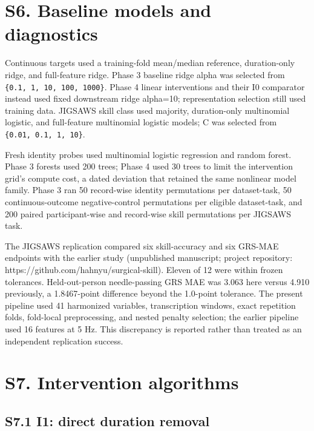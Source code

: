 \documentclass[11pt]{article}
\begin{document}
\section{S6. Baseline models and
diagnostics}\label{s6.-baseline-models-and-diagnostics}

Continuous targets used a training-fold mean/median reference,
duration-only ridge, and full-feature ridge. Phase 3 baseline ridge
alpha was selected from \texttt{\{0.1,\ 1,\ 10,\ 100,\ 1000\}}. Phase 4
linear interventions and their I0 comparator instead used fixed
downstream ridge alpha=10; representation selection still used training
data. JIGSAWS skill class used majority, duration-only multinomial
logistic, and full-feature multinomial logistic models; C was selected
from \texttt{\{0.01,\ 0.1,\ 1,\ 10\}}.

Fresh identity probes used multinomial logistic regression and random
forest. Phase 3 forests used 200 trees; Phase 4 used 30 trees to limit
the intervention grid's compute cost, a dated deviation that retained
the same nonlinear model family. Phase 3 ran 50 record-wise identity
permutations per dataset-task, 50 continuous-outcome negative-control
permutations per eligible dataset-task, and 200 paired participant-wise
and record-wise skill permutations per JIGSAWS task.

The JIGSAWS replication compared six skill-accuracy and six GRS-MAE
endpoints with the earlier study (unpublished manuscript; project
repository: https://github.com/hahnyu/surgical-skill). Eleven of 12 were
within frozen tolerances. Held-out-person needle-passing GRS MAE was
3.063 here versus 4.910 previously, a 1.8467-point difference beyond the
1.0-point tolerance. The present pipeline used 41 harmonized variables,
transcription windows, exact repetition folds, fold-local preprocessing,
and nested penalty selection; the earlier pipeline used 16 features at 5
Hz. This discrepancy is reported rather than treated as an independent
replication success.

\section{S7. Intervention algorithms}\label{s7.-intervention-algorithms}

\subsection{S7.1 I1: direct duration
removal}\label{s7.1-i1-direct-duration-removal}
\end{document}
